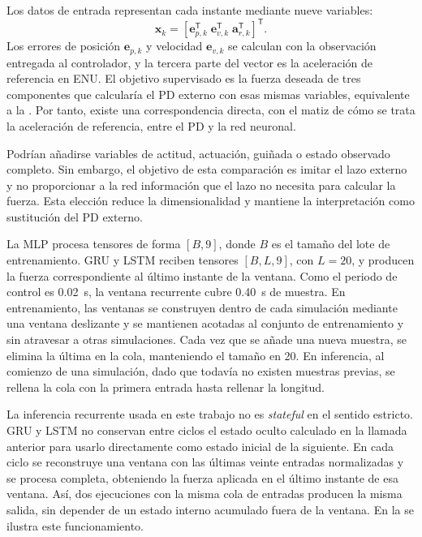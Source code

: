 Los datos de entrada representan cada instante mediante nueve variables:
\begin{equation}
 \bm{x}_k=[\bm{e}_{p,k}^{\mathsf T}\;
           \bm{e}_{v,k}^{\mathsf T}\;
           \bm{a}_{r,k}^{\mathsf T}]^{\mathsf T}.
 \label{eq:variables-neuronales}
\end{equation}
Los errores de posición $\bm{e}_{p,k}$ y velocidad $\bm{e}_{v,k}$ se calculan
con la observación entregada al controlador, y la tercera parte del vector es
la aceleración de referencia en ENU. El objetivo supervisado es la fuerza deseada
de tres componentes que calcularía el PD externo con esas mismas variables, equivalente a la
. Por tanto, existe una correspondencia directa, con el matiz
de cómo se trata la aceleración de referencia, entre el PD y la red neuronal.

Podrían añadirse variables de actitud, actuación, guiñada o estado observado
completo. Sin embargo, el objetivo de esta comparación es imitar el lazo externo
y no proporcionar a la red información que el lazo no necesita para calcular la
fuerza. Esta elección reduce la dimensionalidad y mantiene la interpretación como
sustitución del PD externo.

La MLP procesa tensores de forma $[B,9]$, donde $B$ es el tamaño del lote de
entrenamiento. GRU y LSTM reciben tensores $[B,L,9]$, con $L=20$, y producen la
fuerza correspondiente al último instante de la ventana. Como el periodo de
control es \SI{0.02}{s}, la ventana recurrente cubre \SI{0.40}{s} de muestra.
En entrenamiento, las ventanas se construyen dentro de cada simulación mediante
una ventana deslizante y se mantienen acotadas al conjunto de entrenamiento y sin
atravesar a otras simulaciones. Cada vez que se añade una nueva muestra, se elimina la
última en la cola, manteniendo el tamaño en 20. En inferencia, al comienzo de una simulación,
dado que todavía no existen muestras previas, se rellena la cola con la primera entrada hasta
rellenar la longitud.

La inferencia recurrente usada en este trabajo no es \emph{stateful} en el
sentido estricto. GRU y LSTM no conservan entre ciclos el estado oculto
calculado en la llamada anterior para usarlo directamente como estado inicial
de la siguiente. En cada ciclo se reconstruye una ventana con las últimas veinte
entradas normalizadas y se procesa completa, obteniendo la fuerza aplicada en el
último instante de esa ventana. Así, dos ejecuciones con la misma cola de entradas
producen la misma salida, sin depender de un estado interno acumulado fuera de
la ventana. En la  se ilustra este funcionamiento.

